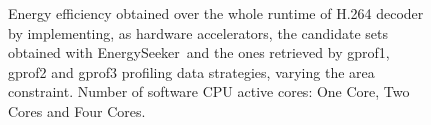 \documentclass[]{usiinfthesis}
\newcommand{\eseeker}{{EnergySeeker}}
\begin{document}
\begin{figure}[t!]
\centering
{}
\caption{Energy efficiency obtained over the whole runtime of H.264 decoder by implementing, as hardware 
accelerators, the candidate sets obtained with \eseeker\ and the ones retrieved by gprof1, gprof2 and 
gprof3 profiling data strategies, varying the area constraint. Number of software CPU active cores: One Core, Two Cores and Four Cores.}
\label{fig:energy}
\end{figure}

\clearpage

%
%
%
%
%
%
%
\end{document}
